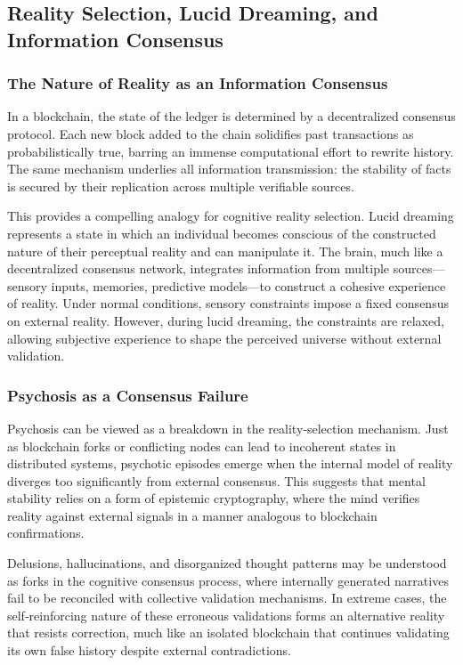 \documentclass[11pt]{article}
\begin{document}
\subsection{Reality Selection, Lucid Dreaming, and Information Consensus}
\subsubsection{The Nature of Reality as an Information Consensus}
In a blockchain, the state of the ledger is determined by a decentralized consensus protocol. Each new block added to the chain solidifies past transactions as probabilistically true, barring an immense computational effort to rewrite history. The same mechanism underlies all information transmission: the stability of facts is secured by their replication across multiple verifiable sources.

This provides a compelling analogy for cognitive reality selection. Lucid dreaming represents a state in which an individual becomes conscious of the constructed nature of their perceptual reality and can manipulate it. The brain, much like a decentralized consensus network, integrates information from multiple sources—sensory inputs, memories, predictive models—to construct a cohesive experience of reality. Under normal conditions, sensory constraints impose a fixed consensus on external reality. However, during lucid dreaming, the constraints are relaxed, allowing subjective experience to shape the perceived universe without external validation.

\subsubsection{Psychosis as a Consensus Failure}
Psychosis can be viewed as a breakdown in the reality‐selection mechanism. Just as blockchain forks or conflicting nodes can lead to incoherent states in distributed systems, psychotic episodes emerge when the internal model of reality diverges too significantly from external consensus. This suggests that mental stability relies on a form of epistemic cryptography, where the mind verifies reality against external signals in a manner analogous to blockchain confirmations.

Delusions, hallucinations, and disorganized thought patterns may be understood as forks in the cognitive consensus process, where internally generated narratives fail to be reconciled with collective validation mechanisms. In extreme cases, the self‐reinforcing nature of these erroneous validations forms an alternative reality that resists correction, much like an isolated blockchain that continues validating its own false history despite external contradictions.
\end{document}
